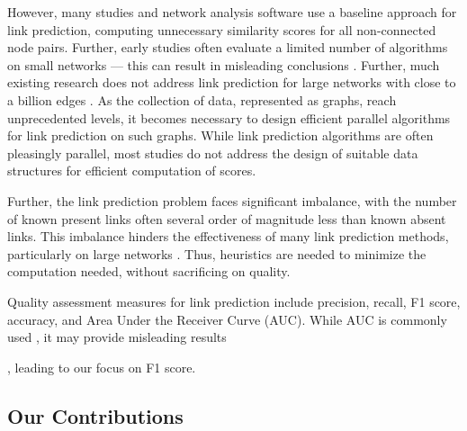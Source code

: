 However, many studies \cite{gatadi2023lpcd, saifi2023fast, benhidour2022approach, mumin2022efficient, rafiee2020cndp, guo2019node, yang2015new, papadimitriou2012fast, wang2019link} and network analysis software \cite{staudt2016networkit, csardi2006igraph} use a baseline approach for link prediction, computing unnecessary similarity scores for all non-connected node pairs. Further, early studies often evaluate a limited number of algorithms on small networks --- this can result in misleading conclusions \cite{zhou2021progresses, zhou2021experimental}. Further, much existing research does not address link prediction for large networks with close to a billion edges \cite{muscoloni2022adaptive, mumin2022efficient, nasiri2021novel, xian2021towards, ghasemian2020stacking, mara2020benchmarking, wang2019link, xu2019distributed, mohan2017scalable, cui2016bounded, garcia2014link, papadimitriou2012fast}. As the collection of data, represented as graphs, reach unprecedented levels, it becomes necessary to design efficient parallel algorithms for link prediction on such graphs. While link prediction algorithms are often pleasingly parallel, most studies do not address the design of suitable data structures for efficient computation of scores.

Further, the link prediction problem faces significant imbalance, with the number of known present links often several order of magnitude less than known absent links. This imbalance hinders the effectiveness of many link prediction methods, particularly on large networks \cite{wang2014link, garcia2014link}. Thus, heuristics are needed to minimize the computation needed, without sacrificing on quality. Quality assessment measures for link prediction include precision, recall, F1 score, accuracy, and Area Under the Receiver Curve (AUC). While AUC is commonly used \cite{arrar2023comprehensive}, it may provide misleading results \cite{yang2015evaluating, lichtnwalter2012link}, leading to our focus on F1 score.





\subsection{Our Contributions}

